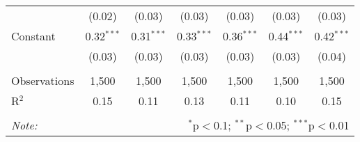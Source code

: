 \documentclass[
]{article}
\begin{document}
\begin{sidewaystable}[!htbp]
\begin{tabular}{@{\extracolsep{1pt}}lcccccc}
  & (0.02) & (0.03) & (0.03) & (0.03) & (0.03) & (0.03) \\ 
  Constant & 0.32$^{***}$ & 0.31$^{***}$ & 0.33$^{***}$ & 0.36$^{***}$ & 0.44$^{***}$ & 0.42$^{***}$ \\ 
  & (0.03) & (0.03) & (0.03) & (0.03) & (0.03) & (0.04) \\ 
 \hline \\[-1.8ex] 
Observations & 1,500 & 1,500 & 1,500 & 1,500 & 1,500 & 1,500 \\ 
R$^{2}$ & 0.15 & 0.11 & 0.13 & 0.11 & 0.10 & 0.15 \\ 
\hline 
\hline \\[-1.8ex] 
\textit{Note:}  & \multicolumn{6}{r}{$^{*}$p$<$0.1; $^{**}$p$<$0.05; $^{***}$p$<$0.01} \\ 
\end{tabular} 
\end{sidewaystable}
\end{document}
